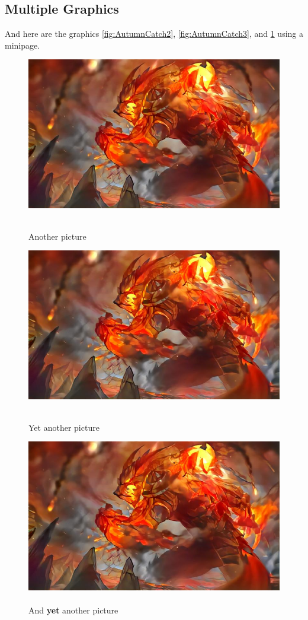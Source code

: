 \documentclass{scrartcl}
\begin{document}
\subsection{Multiple Graphics}
And here are the graphics \ref{fig:AutumnCatch2}, \ref{fig:AutumnCatch3}, and \ref{fig:AutumnCatch4} using a minipage.
\FloatBarrier
    \noindent
\begin{figure}[H]
  \includegraphics[width=\linewidth]{Graphics/Herbstfang.jpg}
  \caption{\cite{mylatex}\\Another picture}\label{fig:AutumnCatch2}
\endminipage\hfill
{}
  \includegraphics[width=\linewidth]{Graphics/Herbstfang.jpg}
  \caption{\cite{mylatex}\\Yet another picture}\label{fig:AutumnCatch3}
\endminipage\hfill
{}%
  \includegraphics[width=\linewidth]{Graphics/Herbstfang.jpg}
  \caption{\cite{mylatex}\\And \textbf{yet} another picture}\label{fig:AutumnCatch4}
\endminipage
    \end{figure}
\end{document}
